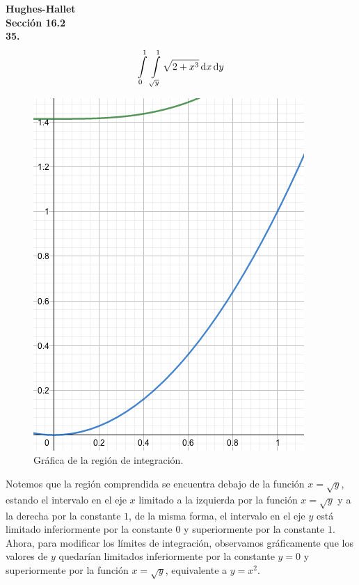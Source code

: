 \documentclass[11pt]{report}
\begin{document}
\textbf{Hughes-Hallet} \\

\textbf{Sección 16.2}\\

\textbf{35.} \\

\[ \int \limits_0^1 \, \int \limits_{\sqrt{y}}^1 \sqrt{2 + x^3} \, \text dx \, \text dy \]

\begin{figure}[h]
	\includegraphics[scale=0.3]{region.png}
	\centering
	\caption{Gráfica de la región de integración.}
	\centering
\end{figure}

Notemos que la región comprendida se encuentra debajo de la función $x = \sqrt{y}$,
estando el intervalo en el eje $x$ limitado a la izquierda por la función
$x = \sqrt{y} $ y a la derecha por la constante $1$, de la misma forma, el
intervalo en el eje $y$ está limitado inferiormente por la constante $0$
y superiormente por la constante $1$.\\

Ahora, para modificar los límites de integración, observamos gráficamente que
los valores de $y$ quedarían limitados inferiormente por la constante $y = 0$
y superiormente por la función $x = \sqrt{y}$, equivalente a $y = x^2$.\\
\end{document}
